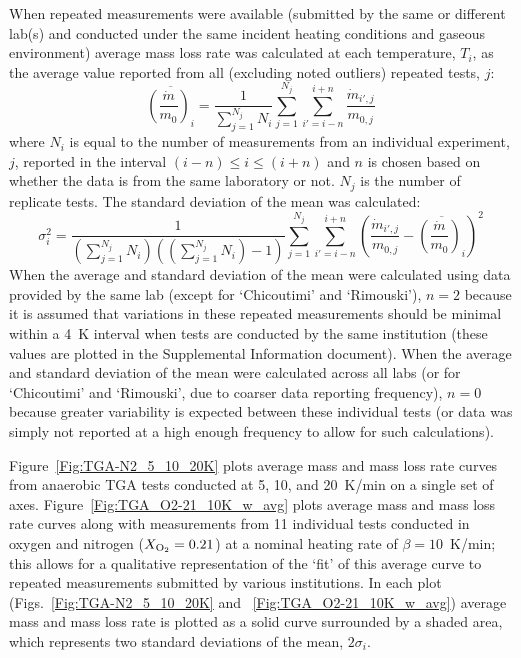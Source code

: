 \documentclass{book}
\begin{document}
When repeated measurements were available (submitted by the same or different lab(s) and conducted under the same incident heating conditions and gaseous environment) average mass loss rate was calculated at each temperature, $T_i$, as the average value reported from all (excluding noted outliers) repeated tests, $j$:
\begin{equation}
\overline{\left(\frac{\dot{m}}{m_0}\right)_i} = \frac{1}{\sum_{j=1}^{N_j}N_i} \sum_{j=1}^{N_j} \sum_{i'=i-n}^{i+n} \frac{\dot{m}_{i',j}}{m_{0,j}}
\end{equation}
where $N_i$ is equal to the number of measurements from an individual experiment, $j$, reported in the interval $(i-n) \leq i \leq (i+n)$ and $n$ is chosen based on whether the data is from the same laboratory or not. $N_j$ is the number of replicate tests. The standard deviation of the mean was calculated:
\begin{equation}
  \sigma_i^2 = \frac{1}{(\sum_{j=1}^{N_j}N_i)((\sum_{j=1}^{N_j}N_i)-1)} \sum_{j=1}^{N_j} \sum_{i'=i-n}^{i+n}  \left( \frac{\dot{m}_{i',j}}{m_{0,j}} - \overline{\left(\frac{\dot{m}}{m_0}\right)_i} \right)^2
\end{equation}
When the average and standard deviation of the mean were calculated using data provided by the same lab (except for ‘Chicoutimi’ and ‘Rimouski’), $n=2$ because it is assumed that variations in these repeated measurements should be minimal within a 4~K interval when tests are conducted by the same institution (these values are plotted in the Supplemental Information document). When the average and standard deviation of the mean were calculated across all labs (or for ‘Chicoutimi’ and ‘Rimouski’, due to coarser data reporting frequency), $n=0$ because greater variability is expected between these individual tests (or data was simply not reported at a high enough frequency to allow for such calculations).

Figure~\ref{Fig:TGA-N2_5_10_20K} plots average mass and mass loss rate curves from anaerobic TGA tests conducted at 5, 10, and 20~K/min on a single set of axes. Figure~\ref{Fig:TGA_O2-21_10K_w_avg} plots average mass and mass loss rate curves along with measurements from 11 individual tests conducted in oxygen and nitrogen ($X_{\rm O_2}=0.21$) at a nominal heating rate of $\beta=10$~K/min; this allows for a qualitative representation of the ‘fit’ of this average curve to repeated measurements submitted by various institutions. In each plot (Figs.~\ref{Fig:TGA-N2_5_10_20K} and ~\ref{Fig:TGA_O2-21_10K_w_avg}) average mass and mass loss rate is plotted as a solid curve surrounded by a shaded area, which represents two standard deviations of the mean, $2 \sigma_i$.
\end{document}
